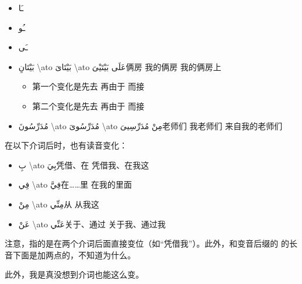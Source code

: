 \begin{Arabic}
    \begin{itemize}
        \item ـَا
        \item ـُو
        \item ـَى
    \end{itemize}
\end{Arabic}

\begin{itemize}
    \item \ac{بَيْتَانِ \ato بَيْتَاىَ \ato عَلَى بَيْتَيْىَ}{俩房 \cto 我的俩房 \cto 我的俩房上}
    \begin{itemize}
        \item 第一个变化是先去 再由于 而接 
        \item 第二个变化是先去 再由于 而接 
    \end{itemize}
    \item \ac{مُدَرِّسُونَ \ato مُدَرِّسُوىَ \ato مِنْ مُدَرِّسِيىَ}{老师们 \cto 我老师们  \cto 来自我的老师们 \\}
\end{itemize}


在以下介词后时，也有读音变化：

\begin{itemize}
    \item \ac{بِ \ato بِيَ}{凭借、在 \cto 凭借我、在我这}
    \item \ac{فِي \ato فِيَّ}{在……里 \cto 在我的里面}
    \item \ac{مِنْ \ato مِنِّي}{从 \cto 从我这}
    \item \ac{عَنْ \ato عَنِّي}{关于、通过 \cto 关于我、通过我}
\end{itemize}

\begin{note}
    注意，指的是在两个介词后面直接变位（如``凭借我''）。此外，和变音后缀的 的长音下面是加两点的，不知道为什么。

    此外，我是真没想到介词也能这么变。
\end{note}